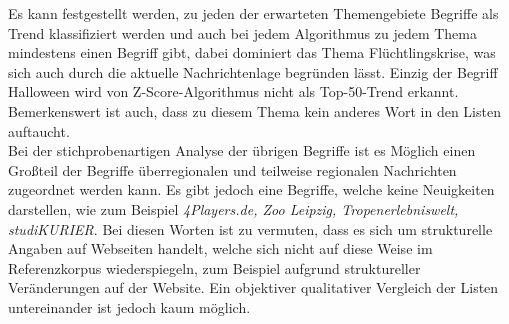 Es kann festgestellt werden, zu jeden der erwarteten Themengebiete Begriffe als Trend klassifiziert werden und auch bei jedem Algorithmus zu jedem Thema mindestens einen Begriff gibt, dabei dominiert das Thema Flüchtlingskrise, was sich auch durch die aktuelle Nachrichtenlage begründen lässt. Einzig der Begriff Halloween wird von Z-Score-Algorithmus nicht als Top-50-Trend erkannt. Bemerkenswert ist auch, dass zu diesem Thema kein anderes Wort in den Listen auftaucht.\\
Bei der stichprobenartigen Analyse der übrigen Begriffe ist es Möglich einen Großteil der Begriffe überregionalen und teilweise regionalen Nachrichten zugeordnet werden kann. Es gibt jedoch eine Begriffe, welche keine Neuigkeiten darstellen, wie zum Beispiel \emph{4Players.de, Zoo Leipzig, Tropenerlebniswelt, studiKURIER}. Bei diesen Worten ist zu vermuten, dass es sich um strukturelle Angaben auf Webseiten handelt, welche sich nicht auf diese Weise im Referenzkorpus wiederspiegeln, zum Beispiel aufgrund struktureller Veränderungen auf der Website.
Ein objektiver qualitativer Vergleich der Listen untereinander ist jedoch kaum möglich.